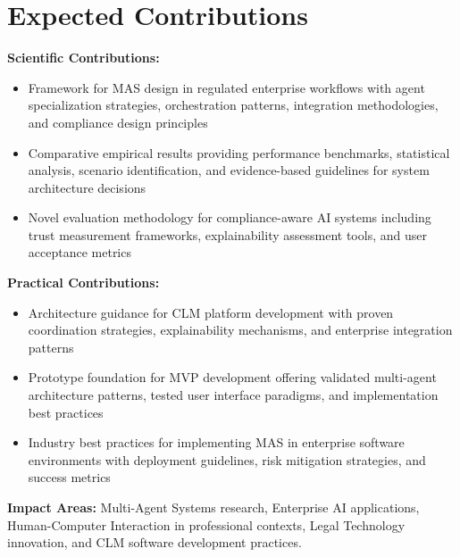 
\section{Expected Contributions}\label{section:expected_contributions}

\textbf{Scientific Contributions:}
\begin{itemize}
    \item Framework for MAS design in regulated enterprise workflows with agent specialization strategies, orchestration patterns, integration methodologies, and compliance design principles
    \item Comparative empirical results providing performance benchmarks, statistical analysis, scenario identification, and evidence-based guidelines for system architecture decisions
    \item Novel evaluation methodology for compliance-aware AI systems including trust measurement frameworks, explainability assessment tools, and user acceptance metrics
\end{itemize}

\textbf{Practical Contributions:}
\begin{itemize}
    \item Architecture guidance for CLM platform development with proven coordination strategies, explainability mechanisms, and enterprise integration patterns
    \item Prototype foundation for MVP development offering validated multi-agent architecture patterns, tested user interface paradigms, and implementation best practices
    \item Industry best practices for implementing MAS in enterprise software environments with deployment guidelines, risk mitigation strategies, and success metrics
\end{itemize}

\textbf{Impact Areas:} Multi-Agent Systems research, Enterprise AI applications, Human-Computer Interaction in professional contexts, Legal Technology innovation, and CLM software development practices.
